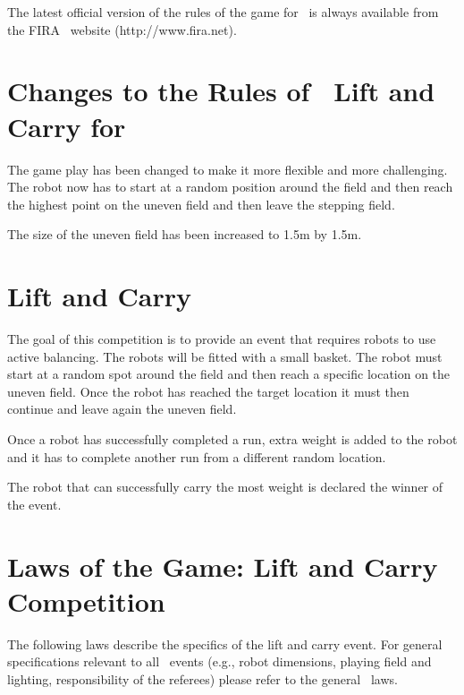 \documentclass[12pt]{hurocup}
\begin{document}
The latest official version of the rules of the game for \HuroCup\ is
always available from the FIRA \HuroCup\ website (http://www.fira.net).

\section*{Changes to the Rules of \HuroCup\ Lift and Carry for \thisyear}

The game play has been changed to make it more flexible and more
challenging. The robot now has to start at a random position around
the field and then reach the highest point on the uneven field and
then leave the stepping field.

The size of the uneven field has been increased to 1.5m by 1.5m.

\newpage

\section{Lift and Carry}
\label{sec:lift-and-carry} 

The goal of this competition is to provide an event that requires
robots to use active balancing. The robots will be fitted with a small
basket. The robot must start at a random spot around the field and
then reach a specific location on the uneven field. Once the robot has
reached the target location it must then continue and leave again the
uneven field.

Once a robot has successfully completed a run, extra weight is added
to the robot and it has to complete another run from a different
random location.

The robot that can successfully carry the most weight is declared the
winner of the event.

\section{Laws of the Game: Lift and Carry Competition}
\label{sec:rules-lift-carry}

The following laws describe the specifics of the lift and carry
event. For general specifications relevant to all \HuroCup\ events
(e.g., robot dimensions, playing field and lighting, responsibility of
the referees) please refer to the general \HuroCup\ laws.

\label{lc-field}
\end{document}
